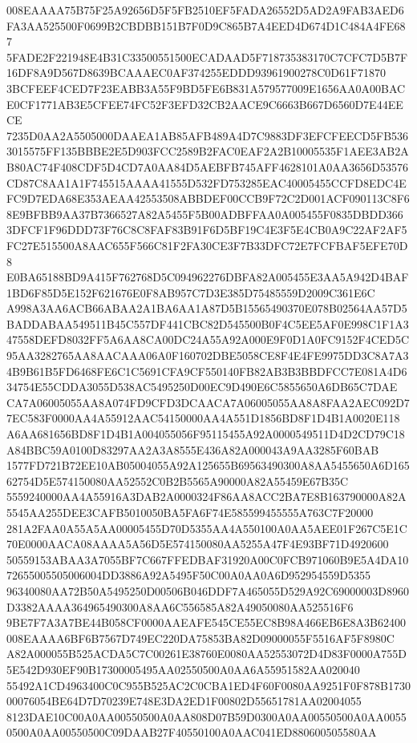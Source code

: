 \documentclass[UTF8,fontset=fandol,zihao=-4,a4paper]{ctexart}
\begin{document}
{{008EAAAA75B75F25A92656D5F5FB2510EF5FADA26552D5AD2A9FAB3AED6FA3AA525500F0699B2CBDBB151B7F0D9C865B7A4EED4D674D1C484A4FE687
5FADE2F221948E4B31C33500551500ECADAAD5F718735383170C7CFC7D5B7F16DF8A9D567D8639BCAAAEC0AF374255EDDD93961900278C0D61F71870
3BCFEEF4CED7F23EABB3A55F9BD5FE6B831A579577009E1656AA0A00BACE0CF1771AB3E5CFEE74FC52F3EFD32CB2AACE9C6663B667D6560D7E44EECE
7235D0AA2A5505000DAAEA1AB85AFB489A4D7C9883DF3EFCFEECD5FB5363015575FF135BBBE2E5D903FCC2589B2FAC0EAF2A2B10005535F1AEE3AB2A
B80AC74F408CDF5D4CD7A0AA84D5AEBFB745AFF4628101A0AA3656D53576CD87C8AA1A1F745515AAAA41555D532FD753285EAC40005455CCFD8EDC4E
FC9D7EDA68E353AEAA42553508ABBDEF00CCB9F72C2D001ACF090113C8F68E9BFBB9AA37B7366527A82A5455F5B00ADBFFAA0A005455F0835DBDD366
3DFCF1F96DDD73F76C8C8FAF83B91F6D5BF19C4E3F5E4CB0A9C22AF2AF5FC27E515500A8AAC655F566C81F2FA30CE3F7B33DFC72E7FCFBAF5EFE70D8
E0BA65188BD9A415F762768D5C094962276DBFA82A005455E3AA5A942D4BAF1BD6F85D5E152F621676E0F8AB957C7D3E385D75485559D2009C361E6C
A998A3AA6ACB66ABAA2A1BA6AA1A87D5B15565490370E078B02564AA57D5BADDABAA549511B45C557DF441CBC82D545500B0F4C5EE5AF0E998C1F1A3
47558DEFD8032FF5A6AA8CA00DC24A55A92A000E9F0D1A0FC9152F4CED5C95AA3282765AA8AACAAA06A0F160702DBE5058CE8F4E4FE9975DD3C8A7A3
4B9B61B5FD6468FE6C1C5691CFA9CF550140FB82AB3B3BBDFCC7E081A4D634754E55CDDA3055D538AC5495250D00EC9D490E6C5855650A6DB65C7DAE
CA7A06005055AA8A074FD9CFD3DCAACA7A06005055AA8A8FAA2AEC092D77EC583F0000AA4A55912AAC54150000AA4A551D1856BD8F1D4B1A0020E118
A6AA681656BD8F1D4B1A004055056F95115455A92A0000549511D4D2CD79C18A84BBC59A0100D83297AA2A3A8555E436A82A000043A9AA3285F60BAB
1577FD721B72EE10AB05004055A92A125655B69563490300A8AA5455650A6D16562754D5E574150080AA52552C0B2B5565A90000A82A55459E67B35C
5559240000AA4A55916A3DAB2A0000324F86AA8ACC2BA7E8B163790000A82A5545AA255DEE3CAFB5010050BA5FA6F74E585599455555A763C7F20000
281A2FAA0A55A5AA00005455D70D5355AA4A550100A0AA5AEE01F267C5E1C70E0000AACA08AAAA5A56D5E574150080AA5255A47F4E93BF71D4920600
50559153ABAA3A7055BF7C667FFEDBAF31920A00C0FCB971060B9E5A4DA1072655005505006004DD3886A92A5495F50C00A0AA0A6D952954559D5355
96340080AA72B50A5495250D00506B046DDF7A465055D529A92C69000003D8960D3382AAAA364965490300A8AA6C556585A82A49050080AA525516F6
9BE7F7A3A7BE44B058CF0000AAEAFE545CE55EC8B98A466EB6E8A3B62400008EAAAA6BF6B7567D749EC220DA75853BA82D09000055F5516AF5F8980C
A82A000055B525ACDA5C7C00261E38760E0080AA52553072D4D83F0000A755D5E542D930EF90B17300005495AA02550500A0AA6A55951582AA020040
55492A1CD4963400C0C955B525AC2C0CBA1ED4F60F0080AA9251F0F878B173000076054BE64D7D70239E748E3DA2ED1F00802D55651781AA02004055
8123DAE10C00A0AA00550500A0AA808D07B59D0300A0AA00550500A0AA00550500A0AA00550500C09DAAB27F40550100A0AAC041ED880600505580AA
}}
\end{document}

